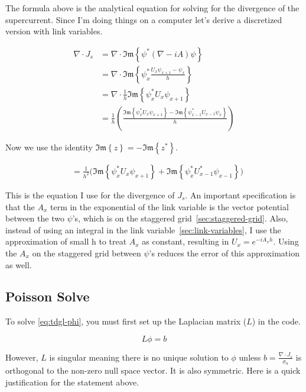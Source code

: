\documentclass[11pt]{article}
\theoremstyle{definition}
\renewcommand{\Im}{\mathfrak{Im}}
\begin{document}
The formula above is the analytical equation for solving for the divergence of the supercurrent. Since I'm doing things on a computer let's derive a discretized version with link variables.

\begin{align}
\nabla \cdot J_s &= \nabla \cdot \Im\!\left\{ \psi^* (\nabla - i A) \psi \right\} \label{eq:divJs-1}\\
&= \nabla \cdot \Im\!\left\{ \psi^*_x \frac{U_x \psi_{x+1} - \psi_x}{h} \right\} \label{eq:divJs-2}\\
&= \nabla \cdot \frac{1}{h} \Im\!\left\{ \psi^*_x U_x \psi_{x+1} \right\} \label{eq:divJs-3}\\
&= \frac{1}{h} \left( \frac{\Im\!\left\{ \psi^*_x U_x \psi_{x+1} \right\} - \Im\!\left\{ \psi^*_{x-1} U_{x-1} \psi_x \right\}}{h} \right) \label{eq:divJs-4}
\end{align}

Now we use the identity $\Im\!\left\{ z \right\} = -\Im\!\left\{ z^* \right\}$.

\begin{align}
&= \frac{1}{h^2} \big( \Im\!\left\{ \psi^*_x U_x \psi_{x+1} \right\} + \Im\!\left\{ \psi_x^* U_{x-1}^* \psi_{x-1} \right\} \big) \label{eq:divJs-final}
\end{align}

This is the equation I use for the divergence of $J_s$. An important specification is that the $A_x$ term in the exponential of the link variable is the vector potential between the two $\psi$'s, which is on the staggered grid~\ref{sec:staggered-grid}. Also, instead of using an integral in the link variable~\ref{sec:link-variables}, I use the approximation of small h to treat $A_x$ as constant, resulting in $U_x = e^{-i A_x h}$. Using the $A_x$ on the staggered grid between $\psi$'s reduces the error of this approximation as well.

\subsection{Poisson Solve}
\label{sec:poisson}

To solve \cref{eq:tdgl-phi}, you must first set up the Laplacian matrix ($L$) in the code.

\begin{equation}
\label{eq:Lphib}
L \phi = b
\end{equation}

However, $L$ is singular meaning there is no unique solution to $\phi$ unless $b = \frac{\nabla \cdot J_s}{\sigma_n}$ is orthogonal to the non-zero null space vector. It is also symmetric.
Here is a quick justification for the statement above.
\end{document}
